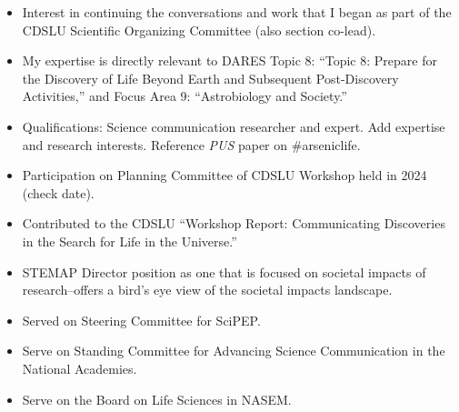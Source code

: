 \documentclass[12pt]{article}
\begin{document}
\begin{itemize}
    \item Interest in continuing the conversations and work that I began as part of the CDSLU Scientific Organizing Committee (also section co-lead).\item My expertise is directly relevant to DARES Topic 8: “Topic 8: Prepare for the Discovery of Life Beyond Earth and Subsequent Post-Discovery Activities,” and Focus Area 9: “Astrobiology and Society.”
    \item Qualifications: Science communication researcher and expert. Add expertise and research interests. Reference \textit{PUS} paper on \#arseniclife.
    
    \item Participation on Planning Committee of CDSLU Workshop held in 2024 (check date).
    \item Contributed to the CDSLU ``Workshop Report: Communicating Discoveries in the Search for Life in the Universe.''
    \item STEMAP Director position as one that is focused on societal impacts of research--offers a bird's eye view of the societal impacts landscape.
    \item Served on Steering Committee for SciPEP.
    \item Serve on Standing Committee for Advancing Science Communication in the National Academies.
    \item Serve on the Board on Life Sciences in NASEM.
\end{itemize}

\newpage

\printbibliography
\end{document}
